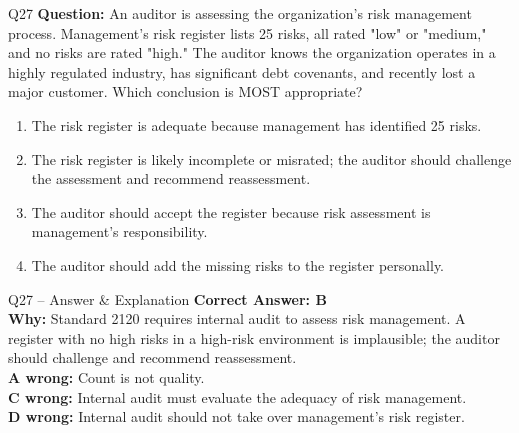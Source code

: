 \documentclass[aspectratio=169,10pt]{beamer}
\begin{document}
	\begin{frame}[t]{Q27}
		\small
		\textbf{Question:} An auditor is assessing the organization's risk management process. Management's risk register lists 25 risks, all rated "low" or "medium," and no risks are rated "high." The auditor knows the organization operates in a highly regulated industry, has significant debt covenants, and recently lost a major customer. Which conclusion is MOST appropriate?
		\begin{enumerate}[label=\Alph*.,itemsep=1pt,topsep=2pt]
			\item The risk register is adequate because management has identified 25 risks.
			\item The risk register is likely incomplete or misrated; the auditor should challenge the assessment and recommend reassessment.
			\item The auditor should accept the register because risk assessment is management's responsibility.
			\item The auditor should add the missing risks to the register personally.
		\end{enumerate}
	\end{frame}
	
	\begin{frame}[t]{Q27 -- Answer \& Explanation}
		\small
		\textbf{Correct Answer: B} \\[4pt]
		\textbf{Why:} Standard 2120 requires internal audit to assess risk management. A register with no high risks in a high-risk environment is implausible; the auditor should challenge and recommend reassessment. \\[4pt]
		\textbf{A wrong:} Count is not quality. \\[2pt]
		\textbf{C wrong:} Internal audit must evaluate the adequacy of risk management. \\[2pt]
		\textbf{D wrong:} Internal audit should not take over management's risk register.
	\end{frame}
	
\end{document}
